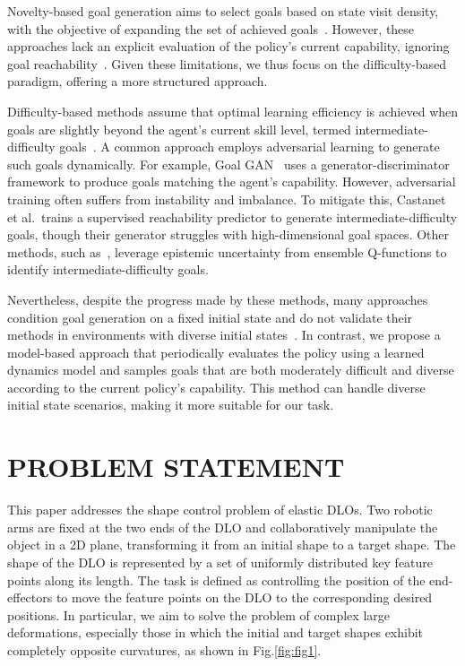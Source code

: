 \documentclass[letterpaper, 10 pt, conference]{ieeeconf}  %
\begin{document}
Novelty-based goal generation aims to select goals based on state visit density, with the objective of expanding the set of achieved goals~\cite{kim2023variational,gong2024goal}. However, these approaches lack an explicit evaluation of the policy's current capability, ignoring goal reachability~\cite{castanet2023stein}. Given these limitations, we thus focus on the difficulty-based paradigm, offering a more structured approach.

Difficulty-based methods assume that optimal learning efficiency is achieved when goals are slightly beyond the agent's current skill level, termed intermediate-difficulty goals~\cite{liu2022goal}. A common approach employs adversarial learning to generate such goals dynamically. For example, Goal GAN~\cite{florensa2018automatic} uses a generator-discriminator framework to produce goals matching the agent's capability. However, adversarial training often suffers from instability and imbalance. To mitigate this, Castanet et al.~\cite{castanet2023stein}trains a supervised reachability predictor to generate intermediate-difficulty goals, though their generator struggles with high-dimensional goal spaces. Other methods, such as~\cite{kim2023variational}, leverage epistemic uncertainty from ensemble Q-functions to identify intermediate-difficulty goals.


Nevertheless, despite the progress made by these methods, many approaches condition goal generation on a fixed initial state and do not validate their methods in environments with diverse initial states~\cite{kim2023variational}. In contrast, we propose a model-based approach that periodically evaluates the policy using a learned dynamics model and samples goals that are both moderately difficult and diverse according to the current policy's capability. This method can handle diverse initial state scenarios, making it more suitable for our task.




\section{PROBLEM STATEMENT}

This paper addresses the shape control problem of elastic DLOs. Two robotic arms are fixed at the two ends of the DLO and collaboratively manipulate the object in a 2D plane, transforming it from an initial shape to a target shape. The shape of the DLO is represented by a set of uniformly distributed key feature points along its length. The task is defined as controlling the position of the end-effectors to move the feature points on the DLO to the corresponding desired positions. In particular, we aim to solve the problem of complex large deformations, especially those in which the initial and target shapes exhibit completely opposite curvatures, as shown in Fig.\ref{fig:fig1}.
\end{document}
